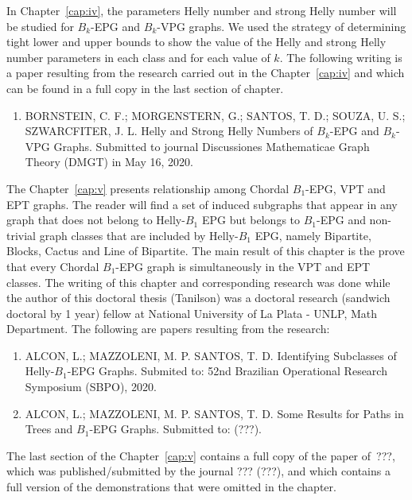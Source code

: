 In Chapter~\ref{cap:iv}, the parameters Helly number and strong Helly number will be studied for  $ B_k$-EPG and $ B_k$-VPG graphs. We used the strategy of determining tight lower and upper bounds to show the value of the Helly and strong Helly number parameters in each class and for each value of $k$. The following writing is a paper resulting from the research carried out in the Chapter~\ref{cap:iv} and which can be found in a full copy in the last section of chapter.

\begin{enumerate}
    \item BORNSTEIN, C. F.; MORGENSTERN, G.; SANTOS, T. D.; SOUZA, U. S.; SZWARCFITER, J. L.  Helly and Strong Helly Numbers of $B_k$-EPG and $B_k$-VPG Graphs. Submitted to journal Discussiones Mathematicae Graph Theory (DMGT) in  May 16, 2020. 
\end{enumerate}



The Chapter~\ref{cap:v} presents relationship among Chordal $B_1$-EPG, VPT and EPT graphs. The reader will find a set of induced subgraphs that appear in any graph that does not belong to Helly-$B_1$ EPG but belongs to $B_1$-EPG and non-trivial graph classes that are included by Helly-$B_1$ EPG, namely Bipartite, Blocks, Cactus and Line of Bipartite. The main result of this chapter is the prove that every Chordal $B_1$-EPG graph is simultaneously in the VPT and EPT classes.  The writing of this chapter and corresponding research was done while the author of this doctoral thesis (Tanilson) was a doctoral research (sandwich doctoral by 1 year) fellow at National University of La Plata - UNLP, Math Department. 
 The following are  papers resulting from the research:
 
 
 
\begin{enumerate}

     \item ALCON, L.; MAZZOLENI, M. P.  SANTOS, T. D. Identifying Subclasses of Helly-$B_1$-EPG Graphs. Submited to: 52nd  Brazilian Operational Research Symposium (SBPO), 2020.
     
     \item ALCON, L.; MAZZOLENI, M. P.  SANTOS, T. D. Some Results for Paths in Trees and $B_1$-EPG Graphs. Submitted to: (???).

\end{enumerate}

 
The last section of the Chapter~\ref{cap:v} contains a full copy of the paper of~???, which was published/submitted by the journal ??? (???), and which contains a full version of the demonstrations that were omitted in the chapter.



